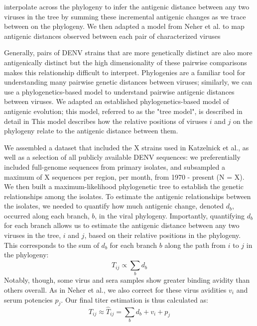 \documentclass[11pt,oneside,letterpaper]{article}
\begin{document}
interpolate across the phylogeny to infer the antigenic distance between any two viruses in the tree by summing these incremental antigenic changes as we trace between  on the phylogeny.
We then adapted a model from Neher et al. to map antigenic distances observed between each pair of characterized viruses



Generally, pairs of DENV strains that are more genetically distinct are also more antigenically distinct
but the high dimensionality of these pairwise comparisons makes this relationship difficult to interpret.
Phylogenies are a familiar tool for understanding many pairwise genetic distances between viruses; similarly, we can use a phylogenetics-based model to understand pairwise antigenic distances between viruses.
We adapted an established phylogenetics-based model of antigenic evolution; this model, referred to as the "tree model", is described in detail in %
This model describes how the relative positions of viruses $i$ and $j$ on the phylogeny relate to the antigenic distance between them.

We assembled a dataset that included the X strains used in Katzelnick et al., as well as a selection of all publicly available DENV sequences: we preferentially included full-genome sequences from primary isolates, and subsampled a maximum of X sequences per region, per month, from 1970 - present (N = X).
We then built a maximum-likelihood phylogenetic tree to establish the genetic relationships among the isolates.
To estimate the antigenic relationships between the isolates, we needed to quantify how much antigenic change, denoted $d_b$, occurred along each branch, $b$, in the viral phylogeny.
Importantly, quantifying $d_b$ for each branch allows us to estimate the antigenic distance between any two viruses in the tree, $i$ and $j$, based on their relative positions in the phylogeny.
This corresponds to the sum of $d_b$ for each branch $b$ along the path from $i$ to $j$ in the phylogeny:
$$\hat{T}_{ij} \propto \sum_{b} d_b$$
Notably, though, some virus and sera samples show greater binding avidity than others overall.
As in Neher et al., we also correct for these virus avidities $v_i$ and serum potencies $p_j$.
Our final titer estimation is thus calculated as: $$T_{ij} \approx \hat{T}_{ij} = \sum_{b} d_b + v_i + p_j$$
\end{document}
